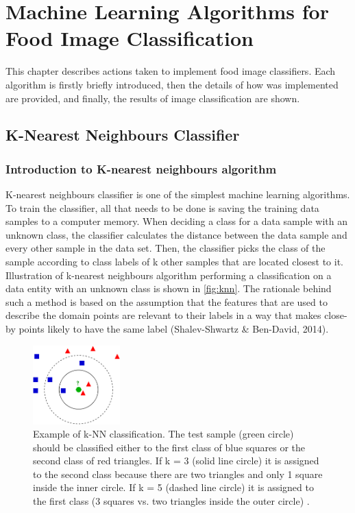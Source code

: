 \chapter{Machine Learning Algorithms for Food Image Classification}
This chapter describes actions taken to implement food image classifiers. Each algorithm is firstly briefly introduced, then the details of how was implemented are provided, and finally, the results of image classification are shown.

\section{K-Nearest Neighbours Classifier}

\subsection{Introduction to K-nearest neighbours algorithm}
K-nearest neighbours classifier is one of the simplest machine learning algorithms. To train the classifier, all that needs to be done is saving the training data samples to a computer memory. When deciding a class for a data sample with an unknown class, the classifier calculates the distance between the data sample and every other sample in the data set. Then, the classifier picks the class of the sample according to class labels of k other samples that are located closest to it. Illustration of k-nearest neighbours algorithm performing a classification on a data entity with an unknown class is shown in \autoref{fig:knn}. The rationale behind such a method is based on the assumption that the features that are used to describe the domain points are relevant to their labels in a way that makes close-by points likely to have the same label (Shalev-Shwartz \& Ben-David, 2014). 


\begin{figure}[h]
\centering
\includegraphics[width=0.3\textwidth]{Figures/knn.png}
\caption{Example of k-NN classification. The test sample (green circle) should be classified either to the first class of blue squares or the second class of red triangles. If k = 3 (solid line circle) it is assigned to the second class because there are two triangles and only 1 square inside the inner circle. If k = 5 (dashed line circle) it is assigned to the first class (3 squares vs. two triangles inside the outer circle) \cite{wikipedia_2017}.}
\label{fig:knn}
\end{figure}


